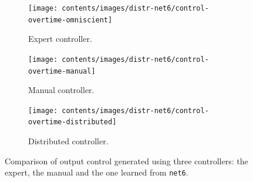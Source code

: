 \begin{figure}[!htb]
	\centering
	\begin{subfigure}[h]{0.3\textwidth}
		\centering
		\texttt{[image: contents/images/distr-net6/control-overtime-omniscient]}%
		\caption{Expert controller.}
	\end{subfigure}
	\hfill
	\begin{subfigure}[h]{0.3\textwidth}
		\centering
		\texttt{[image: contents/images/distr-net6/control-overtime-manual]}%
		\caption{Manual controller.}
	\end{subfigure}
	\hfill
	\begin{subfigure}[h]{0.3\textwidth}
		\centering
		\texttt{[image: contents/images/distr-net6/control-overtime-distributed]}
		\caption{Distributed controller.}
	\end{subfigure}
	\caption[Evaluation of the control learned by \texttt{net6}.]{Comparison 
		of output control generated using three controllers: the expert, the manual 
		and the one learned from \texttt{net6}.}
	\label{fig:net6control}
\end{figure}

